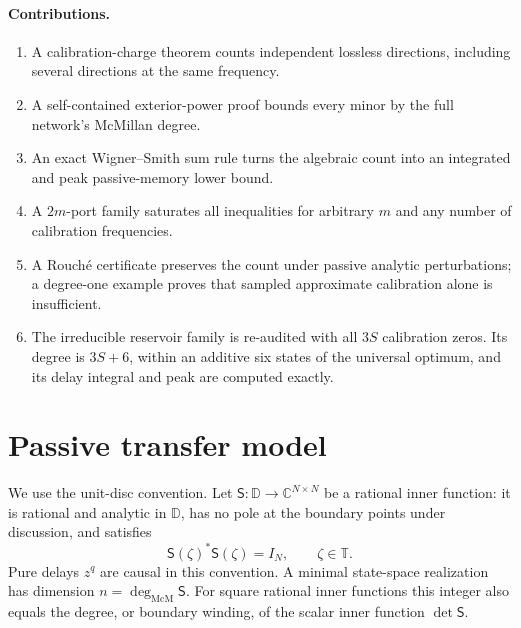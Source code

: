 \documentclass[11pt]{article}
\theoremstyle{definition}
\theoremstyle{remark}
\newcommand{\C}{\mathbb{C}}
\newcommand{\T}{\mathbb{T}}
\newcommand{\D}{\mathbb{D}}
\newcommand{\mcdeg}{\deg_{\mathrm{McM}}}
\begin{document}
\paragraph{Contributions.}
\begin{enumerate}
 \item A calibration-charge theorem counts independent lossless directions,
 including several directions at the same frequency.
 \item A self-contained exterior-power proof bounds every minor by the full
 network's McMillan degree.
 \item An exact Wigner--Smith sum rule turns the algebraic count into an
 integrated and peak passive-memory lower bound.
 \item A $2m$-port family saturates all inequalities for arbitrary $m$ and
 any number of calibration frequencies.
 \item A Rouch\'e certificate preserves the count under passive analytic
 perturbations; a degree-one example proves that sampled approximate
 calibration alone is insufficient.
 \item The irreducible reservoir family is re-audited with all $3S$
 calibration zeros.  Its degree is $3S+6$, within an additive six states of
 the universal optimum, and its delay integral and peak are computed exactly.
\end{enumerate}

\section{Passive transfer model}

We use the unit-disc convention.  Let $\mathsf S:\D\to\C^{N\times N}$ be a
rational inner function: it is rational and analytic in $\D$, has no pole at
the boundary points under discussion, and satisfies
\begin{equation}\label{eq:inner}
 \mathsf S(\zeta)^*\mathsf S(\zeta)=I_N,
 \qquad \zeta\in\T.
\end{equation}
Pure delays $z^q$ are causal in this convention.  A minimal state-space
realization has dimension $n=\mcdeg\mathsf S$.  For square rational inner
functions this integer also equals the degree, or boundary winding, of the
scalar inner function $\det\mathsf S$.
\end{document}
